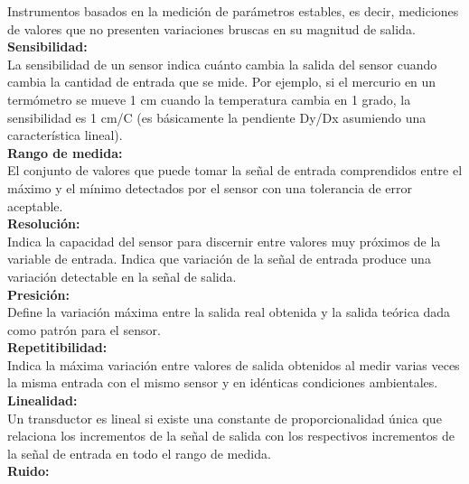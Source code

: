 Instrumentos basados en la medición de parámetros estables, es decir, mediciones de valores que no presenten variaciones bruscas en su magnitud de salida.\\

\textbf{Sensibilidad:}\\

La sensibilidad de un sensor indica cuánto cambia la salida del sensor cuando cambia la cantidad de entrada que se mide. Por ejemplo, si el mercurio en un termómetro se mueve
1 cm cuando la temperatura cambia en 1 grado, la sensibilidad es 1 cm/C (es básicamente la pendiente Dy/Dx asumiendo una característica lineal).\\

\textbf{Rango de medida:}\\

El  conjunto  de  valores  que  puede  tomar  la  señal  de  entrada comprendidos  entre  el  máximo  y  el  mínimo  detectados  por  el  sensor  con  una  tolerancia 
de error aceptable. \\

\textbf{Resolución:} \\

Indica la capacidad del sensor para discernir entre valores muy próximos de la variable de entrada. Indica que variación de la señal de entrada produce una variación detectable en la señal de salida. \\

\textbf{Presición:}\\

Define la variación  máxima entre la salida real obtenida y la salida teórica dada como patrón para el sensor. \\

\textbf{Repetitibilidad:}\\

Indica la  máxima  variación  entre  valores  de  salida  obtenidos al  medir varias veces la misma entrada con el mismo sensor y en idénticas condiciones 
ambientales.\\

\textbf{Linealidad:}\\

Un  transductor  es  lineal  si  existe  una  constante  de  proporcionalidad  única 
que relaciona los incrementos de la señal de salida con los respectivos incrementos de la 
señal de entrada en todo el rango de medida. \\

\textbf{Ruido:}\\

